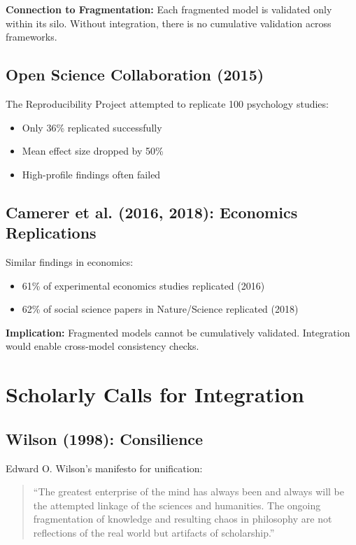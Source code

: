 \textbf{Connection to Fragmentation:}
Each fragmented model is validated only within its silo. Without integration, there is no cumulative validation across frameworks.

\subsection{Open Science Collaboration (2015)}

The Reproducibility Project attempted to replicate 100 psychology studies:
\begin{itemize}
\item Only 36\% replicated successfully
\item Mean effect size dropped by 50\%
\item High-profile findings often failed
\end{itemize}

\subsection{Camerer et al. (2016, 2018): Economics Replications}

Similar findings in economics:
\begin{itemize}
\item 61\% of experimental economics studies replicated (2016)
\item 62\% of social science papers in Nature/Science replicated (2018)
\end{itemize}

\textbf{Implication:}
Fragmented models cannot be cumulatively validated. Integration would enable cross-model consistency checks.



\section{Scholarly Calls for Integration}
\label{sec:meta-calls}

\subsection{Wilson (1998): Consilience}

Edward O. Wilson's manifesto for unification:
\begin{quote}
``The greatest enterprise of the mind has always been and always will be the attempted linkage of the sciences and humanities. The ongoing fragmentation of knowledge and resulting chaos in philosophy are not reflections of the real world but artifacts of scholarship.''
\end{quote}

